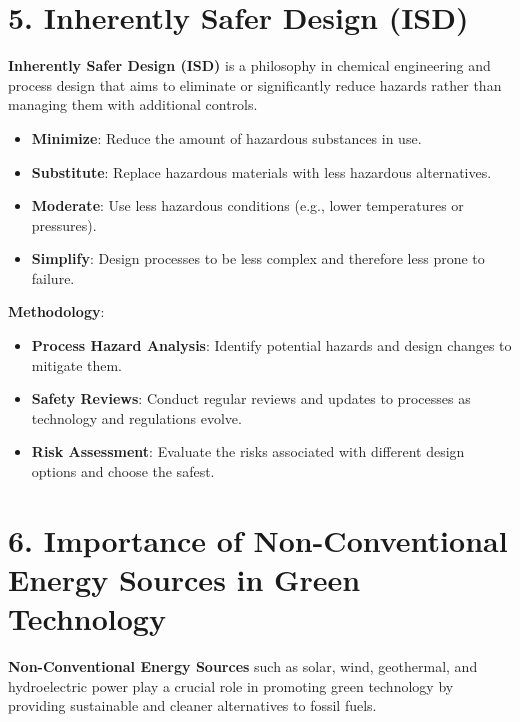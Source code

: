 \documentclass[11pt]{article}
\begin{document}
\section{5. Inherently Safer Design (ISD)}

\textbf{Inherently Safer Design (ISD)} is a philosophy in chemical engineering and process design that aims to eliminate or significantly reduce hazards rather than managing them with additional controls.

\begin{itemize}
	\item \textbf{Minimize}: Reduce the amount of hazardous substances in use.
	\item \textbf{Substitute}: Replace hazardous materials with less hazardous alternatives.
	\item \textbf{Moderate}: Use less hazardous conditions (e.g., lower temperatures or pressures).
	\item \textbf{Simplify}: Design processes to be less complex and therefore less prone to failure.
\end{itemize}

\textbf{Methodology}:
\begin{itemize}
	\item \textbf{Process Hazard Analysis}: Identify potential hazards and design changes to mitigate them.
	\item \textbf{Safety Reviews}: Conduct regular reviews and updates to processes as technology and regulations evolve.
	\item \textbf{Risk Assessment}: Evaluate the risks associated with different design options and choose the safest.
\end{itemize}

\section{6. Importance of Non-Conventional Energy Sources in Green Technology}

\textbf{Non-Conventional Energy Sources} such as solar, wind, geothermal, and hydroelectric power play a crucial role in promoting green technology by providing sustainable and cleaner alternatives to fossil fuels.
\end{document}
